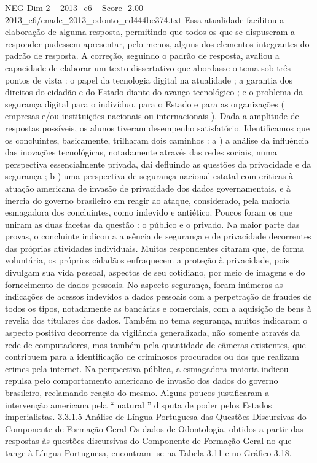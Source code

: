 \begin{textsample}{NEG Dim 2 – 2013\_c6 – Score -2.00 – 2013\_c6/enade\_2013\_odonto\_ed444be374.txt}
Essa atualidade facilitou a elaboração de alguma resposta, permitindo que todos os que se dispuseram a responder pudessem apresentar, pelo menos, alguns dos elementos integrantes do padrão de resposta.
A correção, seguindo o padrão de resposta, avaliou a capacidade de elaborar um texto dissertativo que abordasse o tema sob três pontos de vista : o papel da tecnologia digital na atualidade ; a garantia dos direitos do cidadão e do Estado diante do avanço tecnológico ; e o problema da segurança digital para o indivíduo, para o Estado e para as organizações ( empresas e/ou instituições nacionais ou internacionais ).
Dada a amplitude de respostas possíveis, os alunos tiveram desempenho satisfatório.
Identificamos que os concluintes, basicamente, trilharam dois caminhos : a ) a análise da influência das inovações tecnológicas, notadamente através das redes sociais, numa perspectiva essencialmente privada, daí defluindo as questões da privacidade e da segurança ; b ) uma perspectiva de segurança nacional-estatal com criticas à atuação americana de invasão de privacidade dos dados governamentais, e à inercia do governo brasileiro em reagir ao ataque, considerado, pela maioria esmagadora dos concluintes, como indevido e antiético.
Poucos foram os que uniram as duas facetas da questão : o público e o privado.
Na maior parte das provas, o concluinte indicou a ausência de segurança e de privacidade decorrentes das próprias atividades individuais.
Muitos respondentes citaram que, de forma voluntária, os próprios cidadãos enfraquecem a proteção à privacidade, pois divulgam sua vida pessoal, aspectos de seu cotidiano, por meio de imagens e do fornecimento de dados pessoais.
No aspecto segurança, foram inúmeras as indicações de acessos indevidos a dados pessoais com a perpetração de fraudes de todos os tipos, notadamente as bancárias e comerciais, com a aquisição de bens à revelia dos titulares dos dados.
Também no tema segurança, muitos indicaram o aspecto positivo decorrente da vigilância generalizada, não somente através da rede de computadores, mas também pela quantidade de câmeras existentes, que contribuem para a identificação de criminosos procurados ou dos que realizam crimes pela internet.
Na perspectiva pública, a esmagadora maioria indicou repulsa pelo comportamento americano de invasão dos dados do governo brasileiro, reclamando reação do mesmo.
Alguns poucos justificaram a intervenção americana pela “ natural ” disputa de poder pelos Estados imperialistas. 3.3.1.5 Análise de Língua Portuguesa das Questões Discursivas do Componente de Formação Geral Os dados de Odontologia, obtidos a partir das respostas às questões discursivas do Componente de Formação Geral no que tange à Língua Portuguesa, encontram -se na Tabela 3.11 e no Gráfico 3.18.

\end{textsample}
